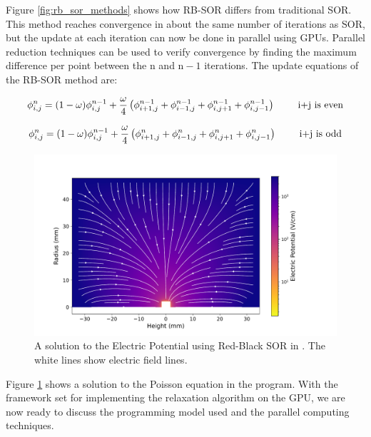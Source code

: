 Figure \ref{fig:rb_sor_methods} shows how RB-SOR differs from traditional SOR. This method reaches convergence in about the same number of iterations as SOR, but the update at each iteration can now be done in parallel using GPUs. Parallel reduction techniques can be used to verify convergence by finding the maximum difference per point between the $\text{n}$ and $\text{n}-1$ iterations. The update equations of the RB-SOR method are:

\begin{equation}{\label{rb_e}}
 \phi_{i,j}^{n} = (1-\omega)\phi^{n-1}_{i,j} + \frac{\omega}{4} \left(\phi^{n-1}_{i+1,j} + \phi^{n-1}_{i-1,j} + \phi^{n-1}_{i,j+1} + \phi^{n-1}_{i,j-1} \right) \qquad \text{ i+j is even}
\end{equation}

\begin{equation}{\label{rb_o}}
 \phi_{i,j}^{n} = (1-\omega)\phi^{n-1}_{i,j} + \frac{\omega}{4} \left(\phi^{n}_{i+1,j} + \phi^n_{i-1,j} + \phi^{n}_{i,j+1} + \phi^n_{i,j-1} \right) \qquad \text{ i+j is odd}
\end{equation}

\begin{figure}[!htb]
\centering
 \includegraphics[width=\linewidth]{ch4/figs/elect_pot_P00698A.pdf}
\caption{\label{fig:sor_pot_sol} A solution to the Electric Potential using Red-Black SOR in {\ehd}. The white lines show electric field lines.}
\label{ch4:fig:elect_pot_soln}
\end{figure}

Figure \ref{ch4:fig:elect_pot_soln} shows a solution to the Poisson equation in the program. With the framework set for implementing the relaxation algorithm on the GPU, we are now ready to discuss the programming model used and the parallel computing techniques.


